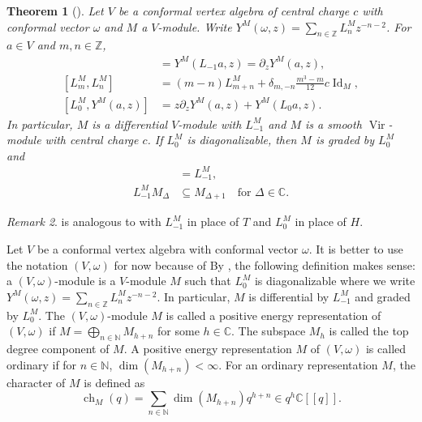 \documentclass[a4paper, 12pt, reqno]{amsart}
\newtheorem{theorem}{Theorem}[section]
\theoremstyle{remark}
\newtheorem{remark}[theorem]{Remark}
\numberwithin{equation}{subsection}
\DeclareMathOperator{\Vir}{Vir}
\DeclareMathOperator{\Id}{Id}
\DeclareMathOperator{\ch}{ch}
\begin{document}
\begin{theorem}[{\cite[Proposition 4.1.5 and (4.1.18)]{lepowsky_introduction_2004}}]
  \label{thr:29}
  Let $V$ be a conformal vertex algebra of central charge $c$ with conformal vector $\omega$ and $M$ a $V$-module.
  Write $Y^M(\omega, z) = \sum_{n \in \mathbb{Z}}L^M_nz^{-n - 2}$.
  For $a \in V$ and $m, n \in \mathbb{Z}$,
  \begin{align*}
    [L^M_{-1}, Y^M(a, z)] &= Y^M(L_{-1}a, z) = \partial_zY^M(a, z), \\
    [L^M_m, L^M_n] &=(m - n)L^M_{m + n} + \delta_{m, -n}\frac{m^3 - m}{12}c\Id_M, \\
    [L^M_0, Y^M(a, z)] &= z\partial_zY^M(a, z) + Y^M(L_0a, z).
  \end{align*}
  In particular, $M$ is a differential $V$-module with $L_{-1}^M $ and $M$ is a smooth $\Vir$-module with central charge $c$.
  If $L^M_0$ is diagonalizable, then $M$ is graded by $L_0^M$ and
  \begin{align*}
    [L_0^M,L_{-1}^M]&=L_{-1}^M, \\
    L^M_{-1}M_\Delta&\subseteq M_{\Delta+1} \quad \text{for }\Delta \in \mathbb{C}.
  \end{align*}
\end{theorem}

\begin{remark}
  \label{rmk:21}
   is analogous to  with $L_{-1}^M$ in place of $T$ and $L_0^M$ in place of $H$.
\end{remark}

Let $V$ be a conformal vertex algebra with conformal vector $\omega$.
It is better to use the notation $(V, \omega)$ for now because of 
By , the following definition makes sense:
a $(V, \omega)$-module is a $V$-module $M$ such that $L^M_0$ is diagonalizable where we write $Y^M(\omega, z) = \sum_{n \in \mathbb{Z}}L^M_nz^{-n - 2}$.
In particular, $M$ is differential by $L^M_{-1}$ and graded by $L^M_0$.
The $(V, \omega)$-module $M$ is called a positive energy representation of $(V, \omega)$ if $M = \bigoplus_{n \in \mathbb{N}}M_{h + n}$ for some $h \in \mathbb{C}$.
The subspace $M_h$ is called the top degree component of $M$.
A positive energy representation $M$ of $(V, \omega)$ is called ordinary if for $n \in \mathbb{N}$, $\dim(M_{h + n}) < \infty$.
For an ordinary representation $M$, the character of $M$ is defined as
\begin{equation*}
  \ch_M(q) = \sum_{n \in \mathbb{N}}\dim(M_{h + n})q^{h + n} \in q^h\mathbb{C}[[q]].
\end{equation*}
\end{document}
